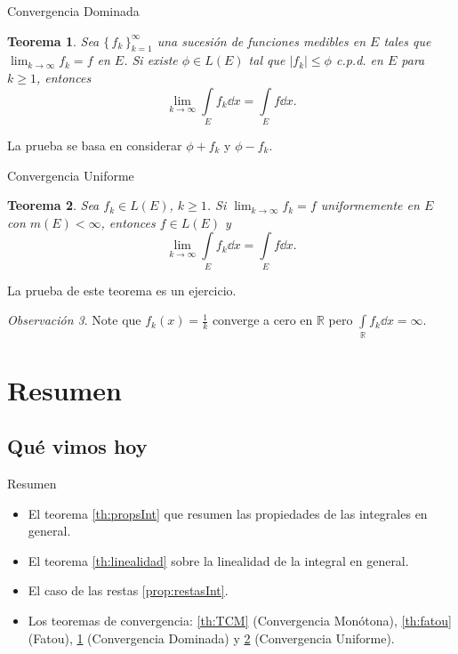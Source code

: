 \documentclass[utf8]{beamer}
\theoremstyle{plain}
\newtheorem{Th}{Teorema}               %
\theoremstyle{definition}
\theoremstyle{remark}
\newtheorem{Rmk}[Th]{Observación}      %
\numberwithin{equation}{section}
\newcommand{\bR}{\mathbb{R}}    %
\newcommand{\set}[1]{\{\,#1\,\}}    %
\renewcommand{\geq}{\geqslant}          %
\renewcommand{\leq}{\leqslant}          %
\newcommand{\suck}{_{k=1}^\infty} %
\renewcommand{\.}{\Cdot}                %
\begin{document}
\begin{frame}{Convergencia Dominada}
  \begin{Th}\label{th:DCT}
    Sea $\set{f_k}\suck$ una sucesión de funciones medibles en $E$ tales que $\lim_{k\to\infty}f_k=f$ en $E$. Si existe $\phi\in L(E)$ tal que $|f_k|\leq \phi$ c.p.d. en $E$ para $k\geq 1$, entonces 
    $$\lim_{k\to\infty}\int\limits_Ef_k\dd x=\int\limits_Ef\dd x.$$
  \end{Th}
La prueba se basa en considerar $\phi+f_k$ y $\phi-f_k$.
\end{frame}

\begin{frame}{Convergencia Uniforme}
  \begin{Th}\label{th:UCT}
    Sea $f_k\in L(E)$, $k\geq 1$. Si $\lim_{k\to\infty}f_k=f$ uniformemente en $E$ con $m(E)<\infty$, entonces $f\in L(E)$ y 
    $$\lim_{k\to\infty}\int\limits_Ef_k\dd x=\int\limits_Ef\dd x.$$
  \end{Th}
  La prueba de este teorema es un \alert{ejercicio}.
  \begin{Rmk}
Note que $f_k(x)=\frac{1}{k}$ converge a cero en $\bR$ pero $\int\limits_\bR f_k\dd x=\infty$.
  \end{Rmk}
\end{frame}

\section*{Resumen}

\subsection*{Qu\'e vimos hoy}

\begin{frame}{Resumen}

  \begin{itemize}
  \item El teorema \ref{th:propsInt} que resumen las propiedades de las integrales en general.
  \item El teorema \ref{th:linealidad} sobre la linealidad de la integral en general.
  \item El caso de las restas \ref{prop:restasInt}.
  \item Los teoremas de convergencia: \ref{th:TCM} (Convergencia Monótona), \ref{th:fatou} (Fatou), \ref{th:DCT} (Convergencia Dominada) y \ref{th:UCT} (Convergencia Uniforme).
  \end{itemize}
  
\end{frame}
\end{document}
